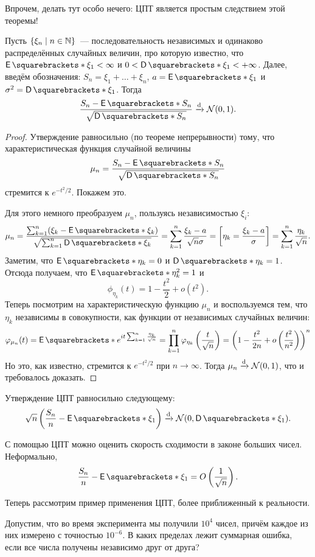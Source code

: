 Впрочем, делать тут особо нечего: ЦПТ является простым следствием этой теоремы!
\begin{theorem}
	Пусть \(\{\xi_{n} \mid n \in \mathbb{N}\}\)~--- последовательность независимых и одинаково распределённых случайных величин, про которую известно, что \(\E{\xi_1} < \infty\) и \(0 < \D{\xi_{1}} < +\infty\). Далее, введём обозначения: \(S_n = \xi_{1} + \dots + \xi_{n}\), \(a = \E{\xi_1}\) и \(\sigma^2 = \D{\xi_{1}}\). Тогда
	\[
		\frac{S_n - \E{S_n}}{\sqrt{\D{S_n}}} \dto \mathcal{N}(0, 1).
	\]
\end{theorem}
\begin{proof}
	Утверждение равносильно (по теореме непрерывности) тому, что характеристическая функция случайной величины
	\[
		\mu_{n} = \frac{S_n - \E{S_n}}{\sqrt{\D{S_n}}}
	\]
	стремится к \(e^{-t^2/2}\). Покажем это.
	
	Для этого немного преобразуем \(\mu_{n}\), пользуясь независимостью \(\xi_{i}\):
	\[
		\mu_{n} = \frac{\sum_{k = 1}^{n} (\xi_{k} - \E{\xi_{k}})}{\sqrt{\sum_{k = 1}^{n} \D{\xi_{k}}}} = \sum_{k = 1}^{n} \frac{\xi_{k} - a}{\sqrt{n}\sigma} = \left[\eta_{k} = \frac{\xi_{k} - a}{\sigma}\right] = \sum_{k = 1}^{n} \frac{\eta_{k}}{\sqrt{n}}.
	\]
	Заметим, что \(\E{\eta_{k}} = 0\) и \(\D{\eta_{k}} = 1\). Отсюда получаем, что \(\E{\eta_{k}^2} = 1\) и
	\[
		\phi_{\eta_k}(t) = 1 - \frac{t^2}{2} + o(t^2).
	\]
	Теперь посмотрим на характеристическую функцию \(\mu_{n}\) и воспользуемся тем, что \(\eta_{k}\) независимы в совокупности, как функции от независимых случайных величин:
	\[
		\phi_{\mu_n}(t) = \E{e^{it\sum_{k = 1}^{n} \frac{\eta_{k}}{\sqrt{n}}}} = \prod_{k = 1}^{n} \phi_{\eta_k}\left(\frac{t}{\sqrt{n}}\right) = \left(1 - \frac{t^2}{2n} + o\left(\frac{t^2}{n^2}\right)\right)^n
	\]
	Но это, как известно, стремится к \(e^{-t^2/2}\) при \(n \to \infty\). Тогда \(\mu_{n} \xrightarrow{\mathrm{d}} \mathcal{N}(0, 1)\), что и требовалось доказать.
\end{proof}
\begin{remark}
	Утверждение ЦПТ равносильно следующему:
	\[
		\sqrt{n}\left(\frac{S_n}{n} - \E{\xi_{1}}\right) \dto \mathcal{N}(0, \D{\xi_1}).
	\]
\end{remark}
\begin{consequence}
	С помощью ЦПТ можно оценить скорость сходимости в законе больших чисел. Неформально,
	\[
		\frac{S_n}{n} - \E{\xi_{1}} = O\left(\frac{1}{\sqrt{n}}\right).
	\]
\end{consequence}
Теперь рассмотрим пример применения ЦПТ, более приближенный к реальности.
\begin{example}
	Допустим, что во время эксперимента мы получили \(10^{4}\) чисел, причём каждое из них измерено с точностью \(10^{-6}\). В каких пределах лежит суммарная ошибка, если все числа получены независимо друг от друга?
\end{example}
